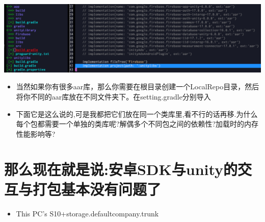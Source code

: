 \documentclass[9pt, b5paper]{article}
\begin{document}
\includegraphics[width=.9\linewidth]{./pic/unityToAndroid_20221124_162337.png}
\begin{itemize}
\item 当然如果你有很多aar库，那么你需要在根目录创建一个LocalRepo目录，然后将你不同的aar库放在不同文件夹下。在setting.gradle分别导入
\item 下面它是这么说的,可是我都把它们放在同一个类库里,看不行的话再移.为什么每个包都需要一个单独的类库呢?解偶多个不同包之间的依赖性?加载时的内存性能影响等?
\end{itemize}

\section{那么现在就是说:安卓SDK与unity的交互与打包基本没有问题了}
\label{sec-8}
\begin{itemize}
\item This PC\HEYAN's S10+\Internal storage\Android\data\com.defaultcompany.trunk\files
\end{itemize}
\end{document}
